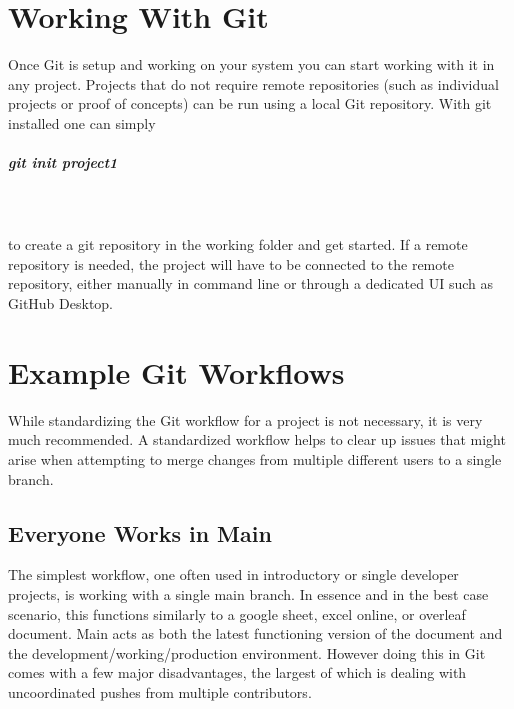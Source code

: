 \documentclass{article}
\begin{document}
\section{Working With Git}
Once Git is setup and working on your system you can start working with it in any project. Projects that do not require remote repositories (such as individual projects or proof of concepts) can be run using a local Git repository. With git installed one can simply 

\subparagraph{git init project1} \mbox{}\\ \\

to create a git repository in the working folder and get started. If a remote repository is needed, the project will have to be connected to the remote repository, either manually in command line or through a dedicated UI such as GitHub Desktop. 

\section{Example Git Workflows}
While standardizing the Git workflow for a project is not necessary, it is very much recommended. A standardized workflow helps to clear up issues that might arise when attempting to merge changes from multiple different users to a single branch.
\subsection{Everyone Works in Main}
The simplest workflow, one often used in introductory or single developer projects, is working with a single main branch. In essence and in the best case scenario, this functions similarly to a google sheet, excel online, or overleaf document. Main acts as both the latest functioning version of the document and the development/working/production environment. However doing this in Git comes with a few major disadvantages, the largest of which is dealing with uncoordinated pushes from multiple contributors.
\end{document}
